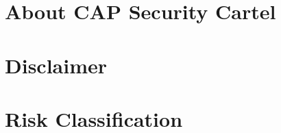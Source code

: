 \hypertarget{about-CAPSC}{%
\section{About CAP Security Cartel}\label{about-CAPSC}}



\hypertarget{disclaimer}{%
\section{Disclaimer}\label{disclaimer}}



\hypertarget{risk-classification}{%
\section{Risk Classification}\label{risk-classification}}


